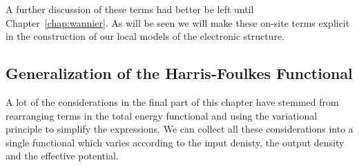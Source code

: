 A further discussion of these terms had better be left until Chapter~\ref{chap:wannier}.
As will be seen we will make these on-site terms explicit in the construction 
of our local models of the electronic structure. 

\subsection{Generalization of the Harris-Foulkes Functional}
%
%

A lot of the considerations in the final part of this chapter have stemmed from 
rearranging terms in the total energy functional and using the variational principle
to simplify the expressions. We can collect all these considerations into a single functional
which varies according to the input denisty, the output density and the effective potential.
%
%

